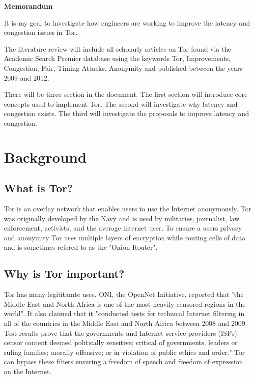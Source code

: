 \documentclass[letterpaper,12pt]{texMemo}
\begin{document}
\singlespace
\begin{center}
\large {\bf Memorandum}
\end{center}
\setlength{\topmargin}{0in}
\maketitle

It is my goal to investigate how engineers are working to improve the latency and congestion issues in Tor.

The literature review will include all scholarly articles on Tor found via the Academic Search
Premier database using the keywords Tor, Improvements, Congestion, Fair, Timing Attacks,
Anonymity and published between the years 2009 and 2012.

There will be three section in the document. The first section will introduce core concepts used to
implement Tor. The second will investigate why latency and congestion exists. The third will
investigate the proposals to improve latency and congestion.

\section*{Background}

    \subsection*{What is Tor?}
    Tor is an overlay network that enables users to use the Internet anonymously. Tor was originally
    developed by the Navy and is used by militaries, journalist, law enforcement, activists, and the
    average internet user\citep[2]{tor:web}. To ensure a users privacy and anonymity Tor uses multiple
    layers of encryption while routing cells of data and is sometimes refered to as the "Onion Router".

    \subsection*{Why is Tor important?}
    Tor has many legititamte uses. ONI, the OpenNet Initiative, reported that "the Middle East and
    North Africa is one of the most heavily censored regions in the world". It also claimed that it
    "conducted tests for technical Internet filtering in all of the countries in the Middle East
    and North Africa between 2008 and 2009. Test results prove that the governments and Internet
    service providers (ISPs) censor content deemed politically sensitive; critical of governments,
    leaders or ruling families; morally offensive; or in violation of public ethics and order." Tor
    can bypass these filters ensuring a freedom of speech and freedom of expression on the Internet.
\end{document}
